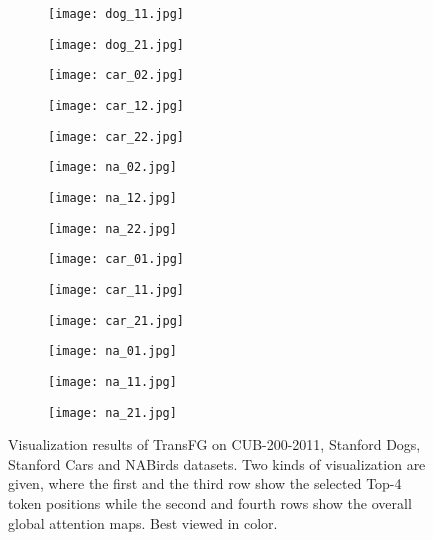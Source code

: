 \documentclass[10pt,twocolumn,letterpaper]{article}
\begin{document}
\begin{figure*}[ht]
    \begin{subfigure}{0.16\linewidth}
        \centering
		\texttt{[image: dog\_11.jpg]}
    \end{subfigure}
    \begin{subfigure}{0.16\linewidth}
        \centering
		\texttt{[image: dog\_21.jpg]}
    \end{subfigure}
    \begin{subfigure}{0.16\linewidth}
        \centering
		\texttt{[image: car\_02.jpg]}
    \end{subfigure}
    \begin{subfigure}{0.16\linewidth}
        \centering
		\texttt{[image: car\_12.jpg]}
    \end{subfigure}
    \begin{subfigure}{0.16\linewidth}
        \centering
		\texttt{[image: car\_22.jpg]}
    \end{subfigure}
    \begin{subfigure}{0.16\linewidth}
        \centering
		\texttt{[image: na\_02.jpg]}
    \end{subfigure}
    \begin{subfigure}{0.16\linewidth}
        \centering
		\texttt{[image: na\_12.jpg]}
    \end{subfigure}
    \begin{subfigure}{0.16\linewidth}
        \centering
		\texttt{[image: na\_22.jpg]}
    \end{subfigure}
    \begin{subfigure}{0.16\linewidth}
        \centering
		\texttt{[image: car\_01.jpg]}
    \end{subfigure}
    \begin{subfigure}{0.16\linewidth}
        \centering
		\texttt{[image: car\_11.jpg]}
    \end{subfigure}
    \begin{subfigure}{0.16\linewidth}
        \centering
		\texttt{[image: car\_21.jpg]}
    \end{subfigure}
    \begin{subfigure}{0.16\linewidth}
        \centering
		\texttt{[image: na\_01.jpg]}
    \end{subfigure}
    \begin{subfigure}{0.16\linewidth}
        \centering
		\texttt{[image: na\_11.jpg]}
    \end{subfigure}
    \begin{subfigure}{0.16\linewidth}
        \centering
		\texttt{[image: na\_21.jpg]}
    \end{subfigure}
    \caption{Visualization results of TransFG on CUB-200-2011, Stanford Dogs, Stanford Cars and NABirds datasets. Two kinds of visualization are given, where the first and the third row show the selected Top-4 token positions while the second and fourth rows show the overall global attention maps. Best viewed in color.}
    \label{fig:vis}
\end{figure*}
\end{document}
